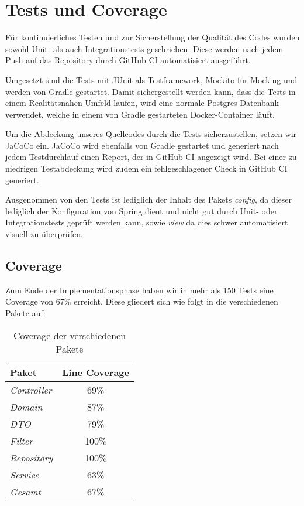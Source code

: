
\chapter{Tests und Coverage}
\label{ch:tests}

Für kontinuierliches Testen und zur Sicherstellung der Qualität des Codes wurden sowohl Unit- als auch Integrationstests geschrieben.
Diese werden nach jedem Push auf das Repository durch GitHub CI automatisiert ausgeführt.

Umgesetzt sind die Tests mit JUnit als Testframework, Mockito für Mocking und werden von Gradle gestartet.
Damit sichergestellt werden kann, dass die Tests in einem Realitätsnahen Umfeld laufen,
wird eine normale Postgres-Datenbank verwendet, welche in einem von Gradle gestarteten Docker-Container läuft.

Um die Abdeckung unseres Quellcodes durch die Tests sicherzustellen, setzen wir JaCoCo ein.
JaCoCo wird ebenfalls von Gradle gestartet und generiert nach jedem Testdurchlauf einen Report, der in GitHub CI angezeigt wird.
Bei einer zu niedrigen Testabdeckung wird zudem ein fehlgeschlagener Check in GitHub CI generiert.

Ausgenommen von den Tests ist lediglich der Inhalt des Pakets \textit{config},
da dieser lediglich der Konfiguration von Spring dient und nicht gut durch Unit- oder Integrationstests geprüft werden kann, sowie \textit{view} da dies schwer automatisiert visuell zu überprüfen.

\newpage

\section{Coverage}\label{sec:coverage}

Zum Ende der Implementationsphase haben wir in mehr als 150 Tests eine Coverage von 67\% erreicht.
Diese gliedert sich wie folgt in die verschiedenen Pakete auf:

\begin{table}[h]
    \centering
    \renewcommand{\arraystretch}{1.3}
    \begin{tabular}{l|c}
        \textbf{Paket} & \textbf{Line Coverage} \\
        \hline
        \hline
        \textit{Controller}  & 69\% \\
        \textit{Domain}      & 87\% \\
        \textit{DTO}         & 79\% \\
        \textit{Filter}      & 100\% \\
        \textit{Repository}  & 100\% \\
        \textit{Service}     & 63\% \\
        \hline
        \textit{Gesamt}      & 67\% \\
    \end{tabular}
    \caption{Coverage der verschiedenen Pakete}
    \label{tab:progress}
\end{table}
